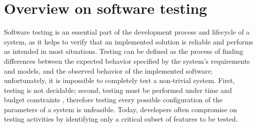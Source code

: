 \section{Overview on software testing}
Software testing is an essential part of the development process and lifecycle of a system, as it helps to verify that an implemented solution is reliable and performs as intended in most situations. Testing can be defined as the process of finding differences between the expected behavior specified by the system's requirements and models, and the observed behavior of the implemented software; unfortunately, it is impossible to completely test a non-trivial system. First, testing is not decidable; second, testing must be performed under time and budget constraints \cite{OOSE}, therefore testing every possible configuration of the parameters of a system is unfeasible.
Today, developers often compromise on testing activities by identifying only a critical subset of features to be tested.

